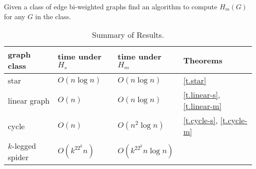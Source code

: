\begin{problem}[
	HM]
	Given a class of edge bi-weighted graphs find an algorithm to compute $H_m(G) $
	for any $G$
	in the class.
\end{problem}

\begin{table*}[h!]
	\begin{center}
		\caption{Summary of Results.}
		\label{tbl:summary}
		\begin{tabular}{|l|l|l|l|}
			\hline
			graph class & time under $H_s$ & time under $H_m$  & Theorems  \\
			\hline
			star            &        $O(n \log n)$  & $O(n \log n)$        & \ref{t.star}		\\
						\hline
			linear graph & $O(n)$        		&$O(n \log n)$ 	& \ref{t.linear-s}, \ref{t.linear-m} \\
						\hline
			cycle 		 & $O(n)$ 		& $O(n^2 \log n)$ 		&  \ref{t.cycle-s}, \ref{t.cycle-m} \\
									\hline
			$k$-legged spider 		 & $O(k^22^k n)$ 		& $O(k^22^kn \log n)$ 		&   \\
			\hline
		\end{tabular}
	\end{center}
\end{table*}

